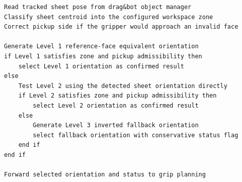 \begin{lstlisting}[caption={Pseudocode for three-level orientation selection.}, label={lst:orientation-selection}]
Read tracked sheet pose from drag&bot object manager
Classify sheet centroid into the configured workspace zone
Correct pickup side if the gripper would approach an invalid face

Generate Level 1 reference-face equivalent orientation
if Level 1 satisfies zone and pickup admissibility then
    select Level 1 orientation as confirmed result
else
    Test Level 2 using the detected sheet orientation directly
    if Level 2 satisfies zone and pickup admissibility then
        select Level 2 orientation as confirmed result
    else
        Generate Level 3 inverted fallback orientation
        select fallback orientation with conservative status flag
    end if
end if

Forward selected orientation and status to grip planning
\end{lstlisting}

